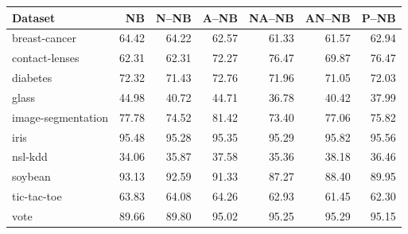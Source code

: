 \begin{tabular}{lrrrrrr}
\toprule
Dataset & NB & N--NB & A--NB & NA--NB & AN--NB & P--NB \\
\midrule
breast-cancer & 64.42 & 64.22 & 62.57 & 61.33 & 61.57 & 62.94 \\
contact-lenses & 62.31 & 62.31 & 72.27 & 76.47 & 69.87 & 76.47 \\
diabetes & 72.32 & 71.43 & 72.76 & 71.96 & 71.05 & 72.03 \\
glass & 44.98 & 40.72 & 44.71 & 36.78 & 40.42 & 37.99 \\
image-segmentation & 77.78 & 74.52 & 81.42 & 73.40 & 77.06 & 75.82 \\
iris & 95.48 & 95.28 & 95.35 & 95.29 & 95.82 & 95.56 \\
nsl-kdd & 34.06 & 35.87 & 37.58 & 35.36 & 38.18 & 36.46 \\
soybean & 93.13 & 92.59 & 91.33 & 87.27 & 88.40 & 89.95 \\
tic-tac-toe & 63.83 & 64.08 & 64.26 & 62.93 & 61.45 & 62.30 \\
vote & 89.66 & 89.80 & 95.02 & 95.25 & 95.29 & 95.15 \\
\bottomrule
\end{tabular}
